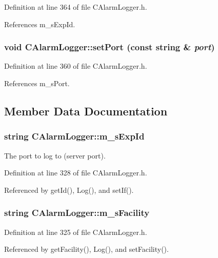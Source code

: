 Definition at line 364 of file CAlarm\-Logger.h.

References m\_\-s\-Exp\-Id.
\subsubsection{\setlength{\rightskip}{0pt plus 5cm}void CAlarm\-Logger::set\-Port (const string \& {\em port})\hspace{0.3cm}{\tt  [inline, protected]}}\label{classCAlarmLogger_b2}




Definition at line 360 of file CAlarm\-Logger.h.

References m\_\-s\-Port.

\subsection{Member Data Documentation}
\subsubsection{\setlength{\rightskip}{0pt plus 5cm}string CAlarm\-Logger::m\_\-s\-Exp\-Id\hspace{0.3cm}{\tt  [private]}}\label{classCAlarmLogger_o3}


The port to log to (server port).



Definition at line 328 of file CAlarm\-Logger.h.

Referenced by get\-Id(), Log(), and set\-If().
\subsubsection{\setlength{\rightskip}{0pt plus 5cm}string CAlarm\-Logger::m\_\-s\-Facility\hspace{0.3cm}{\tt  [private]}}\label{classCAlarmLogger_o0}




Definition at line 325 of file CAlarm\-Logger.h.

Referenced by get\-Facility(), Log(), and set\-Facility().

